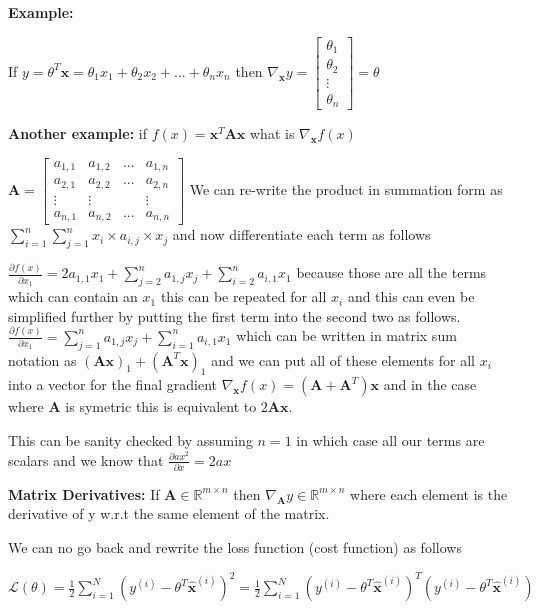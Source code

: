 \documentclass[twocolumn, letter, 10pt, landscape]{article}
\begin{document}
\textbf{Example:}

If $y = \theta^T\mathbf{x} = \theta_1x_1 + \theta_2x_2 + ... + \theta_nx_n$ then $\nabla_\mathbf{x}y = \begin{bmatrix} \theta_1 \\ \theta_2 \\ \vdots \\ \theta_n \end{bmatrix} = \theta$

\textbf{Another example:}
if $f(x) = \mathbf{x}^T\mathbf{A}\mathbf{x}$ what is $\nabla_{\mathbf{x}}f(x)$

$\mathbf{A} = \begin{bmatrix} a_{1,1} & a_{1,2} & ... & a_{1,n} \\
  a_{2,1} & a_{2,2} & ... & a_{2,n}\\
  \vdots & \vdots & & \vdots \\
  a_{n,1} & a_{n,2} & ... & a_{n,n}
\end{bmatrix}$ We can re-write the product in summation form as\\
$\sum_{i=1}^{n}\sum_{j=1}^{n} x_i \times a_{i,j} \times x_j$ and now differentiate each term as follows

$\frac{\partial f(x)}{\partial x_1} = 2a_{1,1}x_1 + \sum_{j=2}^{n}a_{1,j}x_j + \sum_{i=2}^{n}a_{i,1}x_1$ because those are all the terms which can contain an $x_1$ this can be repeated for all $x_i$ and this can even be simplified further by putting the first term into the second two as follows. $\frac{\partial f(x)}{\partial x_1} = \sum_{j=1}^{n}a_{1,j}x_j + \sum_{i=1}^{n}a_{i,1}x_1$ which can be written in matrix sum notation as $(\mathbf{A}\mathbf{x})_1 + (\mathbf{A}^T\mathbf{x})_1$ and we can put all of these elements for all $x_i$ into a vector for the final gradient $\nabla_{\mathbf{x}}f(x) = (\mathbf{A}+\mathbf{A}^T)\mathbf{x}$ and in the case where $\mathbf{A}$ is symetric this is equivalent to $2\mathbf{Ax}$.

This can be sanity checked by assuming $n=1$ in which case all our terms are scalars and we know that $\frac{\partial ax^2}{\partial x} = 2ax$

\textbf{Matrix Derivatives:} If $\mathbf{A}\in \mathbb{R}^{m\times n}$ then $\nabla_{\mathbf{A}}y \in \mathbb{R}^{m\times n}$ where each element is the derivative of y w.r.t the same element of the matrix.

We can no go back and rewrite the loss function (cost function) as follows

$\mathcal{L}(\theta) = \frac{1}{2}\sum_{i=1}^N(y^{(i)}-\theta^T\hat{\mathbf{x}}^{(i)})^2 = \frac{1}{2}\sum_{i=1}^N(y^{(i)}-\theta^T\hat{\mathbf{x}}^{(i)})^T(y^{(i)}-\theta^T\hat{\mathbf{x}}^{(i)})$
\end{document}
